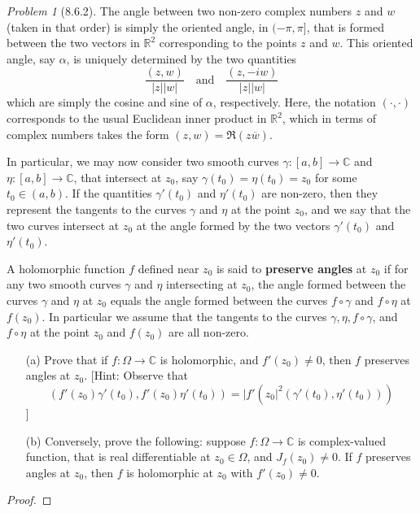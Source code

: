 \documentclass[10pt]{article}
\newcommand{\sk}{\vskip 6mm}
\newcommand{\bb}[1]{\mathbb{#1}}
\newcommand{\conj}[1]{\overline{#1}}
\theoremstyle{remark}
\newtheorem{problem}{Problem}
\theoremstyle{remark}
\begin{document}
\begin{problem}[8.6.2]
  The angle between two non-zero complex numbers $z$ and $w$ (taken in that
  order) is simply the oriented angle, in $(-\pi,\pi]$, that is formed between
  the two vectors in $\bb{R}^2$ corresponding to the points $z$ and $w$. This
  oriented angle, say $\alpha$, is uniquely determined by the two quantities
  \[
    \frac{(z,w)}{|z||w|}\quad\text{and}\quad \frac{(z,-iw)}{|z||w|}
  \]
  which are simply the cosine and sine of $\alpha$, respectively. Here, the
  notation $(\cdot,\cdot)$ corresponds to the usual Euclidean inner product in
  $\bb{R}^2$, which in terms of complex numbers takes the form
  $(z,w)=\Re(z\conj{w})$.

  In particular, we may now consider two smooth curves
  $\gamma:[a,b]\rightarrow\bb{C}$ and $\eta:[a,b]\rightarrow\bb{C}$, that
  intersect at $z_0$, say $\gamma(t_0)=\eta(t_0)=z_0$ for some
  $t_0\in(a,b)$. If the quantities $\gamma'(t_0)$ and $\eta'(t_0)$ are
  non-zero, then they represent the tangents to the curves $\gamma$ and
  $\eta$ at the point $z_0$, and we say that the two curves intersect at
  $z_0$ at the angle formed by the two vectors $\gamma'(t_0)$ and $\eta'(t_0)$.

  A holomorphic function $f$ defined near $z_0$ is said to
  \textbf{preserve angles} at $z_0$ if for any two smooth curves $\gamma$ and
  $\eta$ intersecting at $z_0$, the angle formed between the curves $\gamma$ and
  $\eta$ at $z_0$ equals the angle formed between the curves $f\circ\gamma$
  and $f\circ\eta$ at $f(z_0)$. In particular we assume that the tangents to
  the curves $\gamma,\eta,f\circ\gamma$, and $f\circ\eta$ at the point $z_0$ and
  $f(z_0)$ are all non-zero.
  \begin{enumerate}
  \item[(a)] Prove that if $f:\Omega\rightarrow\bb{C}$ is holomorphic, and
    $f'(z_0)\neq 0$, then $f$ preserves angles at $z_0$. [Hint: Observe that
    \[
      (f'(z_0)\gamma'(t_0),f'(z_0)\eta'(t_0))=|f'(z_0|^2(\gamma'(t_0),\eta'(t_0)))
    \]
      ]
    \item[(b)] Conversely, prove the following: suppose
      $f:\Omega\rightarrow\bb{C}$ is complex-valued function, that is real
      differentiable at $z_0\in\Omega$, and $J_f(z_0)\neq 0$. If $f$ preserves
      angles at $z_0$, then $f$ is holomorphic at $z_0$ with $f'(z_0)\neq 0$.
  \end{enumerate}
\end{problem}

\begin{proof}
  
\end{proof}

\sk

\end{document}
